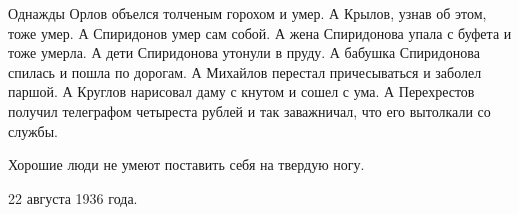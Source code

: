 Однажды Орлов объелся толченым горохом и умер. А Крылов, узнав об  этом, тоже умер. А Спиридонов умер сам собой. А жена Спиридонова упала с буфета и тоже умерла. А дети Спиридонова утонули в пруду. А бабушка Спиридонова спилась и пошла по дорогам. А  Михайлов перестал  причесываться и заболел паршой.  А Круглов  нарисовал  даму  с кнутом и сошел с ума. А Перехрестов получил  телеграфом четыреста рублей  и  так заважничал, что его вытолкали со службы.

Хорошие люди не умеют поставить себя  на твердую ногу.
\begin{flushright}22 августа 1936 года. \end{flushright}